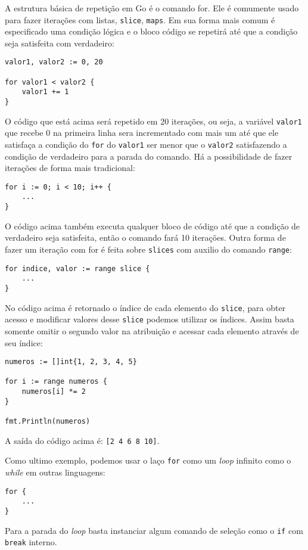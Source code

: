 \documentclass{SBCbookchapter}
\begin{document}
A estrutura básica de repetição em Go é o comando for. Ele é comumente usado para fazer iterações com listas, \texttt{slice}, \texttt{maps}. Em sua forma mais comum é especificado uma condição lógica e o bloco código se repetirá até que a condição seja satisfeita com verdadeiro:

\begin{lstlisting}
valor1, valor2 := 0, 20

for valor1 < valor2 {
	valor1 += 1
}
\end{lstlisting}

O código que está acima será repetido em 20 iterações, ou seja, a variável \texttt{valor1} que recebe 0 na primeira linha sera incrementado com mais um até que ele satisfaça a condição do \texttt{for} do \texttt{valor1} ser menor que o \texttt{valor2} satisfazendo a condição de verdadeiro para a parada do comando. Há a possibilidade de fazer iterações de forma mais tradicional: 

\begin{lstlisting}
for i := 0; i < 10; i++ {
	...
}
\end{lstlisting}

O código acima também executa qualquer bloco de código até que a condição de verdadeiro seja satisfeita, então o comando fará 10 iterações. Outra forma de fazer um iteração com for é feita sobre \texttt{slices} com auxilio do comando \texttt{range}:

\begin{lstlisting}
for indice, valor := range slice {
	...
}
\end{lstlisting}

No código acima é retornado o índice de cada elemento do \texttt{slice}, para obter acesso e modificar valores desse \texttt{slice} podemos utilizar os índices. Assim basta somente omitir o segundo valor na atribuição e acessar cada elemento através de seu índice: 


\begin{lstlisting}
numeros := []int{1, 2, 3, 4, 5}

for i := range numeros {
	numeros[i] *= 2
}

fmt.Println(numeros)
\end{lstlisting}

A saída do código acima é: \texttt{[2 4 6 8 10]}.

Como ultimo exemplo, podemos usar o laço \texttt{for} como um \textit{loop} infinito como o \textit{while} em outras linguagens:
\begin{lstlisting}
for {
	...
}
\end{lstlisting}
Para a parada do \textit{loop} basta instanciar algum comando de seleção como o \texttt{if} com \texttt{break} interno.
\end{document}
